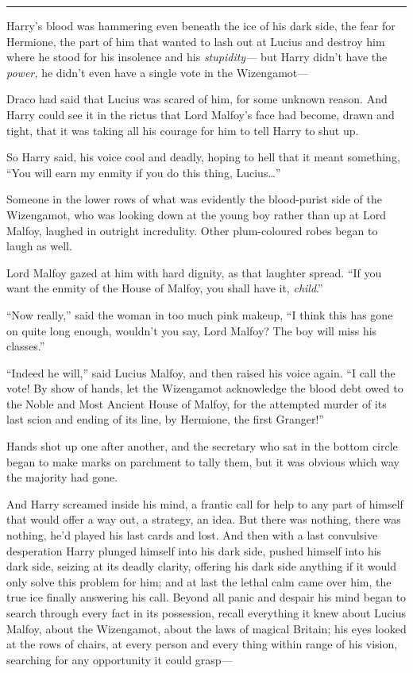 \begin{center}\rule{3in}{0.4pt}\end{center}

Harry's blood was hammering even beneath the ice of his dark side, the
fear for Hermione, the part of him that wanted to lash out at Lucius and
destroy him where he stood for his insolence and his \emph{stupidity---}
but Harry didn't have the \emph{power,} he didn't even have a single
vote in the Wizengamot---

Draco had said that Lucius was scared of him, for some unknown reason.
And Harry could see it in the rictus that Lord Malfoy's face had become,
drawn and tight, that it was taking all his courage for him to tell
Harry to shut up.

So Harry said, his voice cool and deadly, hoping to hell that it meant
something, ``You will earn my enmity if you do this thing,
Lucius\ldots{}''

Someone in the lower rows of what was evidently the blood-purist side of
the Wizengamot, who was looking down at the young boy rather than up at
Lord Malfoy, laughed in outright incredulity. Other plum-coloured robes
began to laugh as well.

Lord Malfoy gazed at him with hard dignity, as that laughter spread.
``If you want the enmity of the House of Malfoy, you shall have it,
\emph{child}.''

``Now really,'' said the woman in too much pink makeup, ``I think this
has gone on quite long enough, wouldn't you say, Lord Malfoy? The boy
will miss his classes.''

``Indeed he will,'' said Lucius Malfoy, and then raised his voice again.
``I call the vote! By show of hands, let the Wizengamot acknowledge the
blood debt owed to the Noble and Most Ancient House of Malfoy, for the
attempted murder of its last scion and ending of its line, by Hermione,
the first Granger!''

Hands shot up one after another, and the secretary who sat in the bottom
circle began to make marks on parchment to tally them, but it was
obvious which way the majority had gone.

And Harry screamed inside his mind, a frantic call for help to any part
of himself that would offer a way out, a strategy, an idea. But there
was nothing, there was nothing, he'd played his last cards and lost. And
then with a last convulsive desperation Harry plunged himself into his
dark side, pushed himself into his dark side, seizing at its deadly
clarity, offering his dark side anything if it would only solve this
problem for him; and at last the lethal calm came over him, the true ice
finally answering his call. Beyond all panic and despair his mind began
to search through every fact in its possession, recall everything it
knew about Lucius Malfoy, about the Wizengamot, about the laws of
magical Britain; his eyes looked at the rows of chairs, at every person
and every thing within range of his vision, searching for any
opportunity it could grasp---
